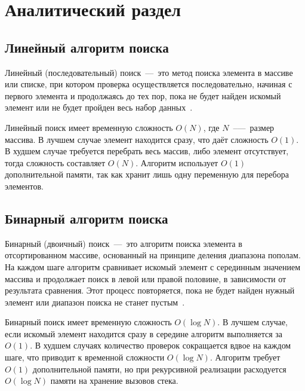 \chapter{Аналитический раздел}
\section{Линейный алгоритм поиска}
Линейный (последовательный) поиск~--–~это метод поиска элемента в массиве или списке, при котором проверка осуществляется последовательно, начиная с первого элемента и продолжаясь до тех пор, пока не будет найден искомый элемент или не будет пройден весь набор данных~\cite{lin_search_alg}.

Линейный поиск имеет временную сложность $O(N)$, где $N$~--—~размер массива. В лучшем случае элемент находится сразу, что даёт сложность $O(1)$. В худшем случае требуется перебрать весь массив, либо элемент отсутствует, тогда сложность составляет $O(N)$. Алгоритм использует $O(1)$ дополнительной памяти, так как хранит лишь одну переменную для перебора элементов.

\section{Бинарный алгоритм поиска}
Бинарный (двоичный) поиск~---~это алгоритм поиска элемента в отсортированном массиве, основанный на принципе деления диапазона пополам. На каждом шаге алгоритм сравнивает искомый элемент с серединным значением массива и продолжает поиск в левой или правой половине, в зависимости от результата сравнения. Этот процесс повторяется, пока не будет найден нужный элемент или диапазон поиска не станет пустым~\cite{bin_search_alg}.  

Бинарный поиск имеет временную сложность $O(\log N)$. В лучшем случае, если искомый элемент находится сразу в середине алгоритм выполняется за $O(1)$. В худшем случаях количество проверок сокращается вдвое на каждом шаге, что приводит к временной сложности $O(\log N)$. Алгоритм требует $O(1)$ дополнительной памяти, но при рекурсивной реализации расходуется $O(\log N)$ памяти на хранение вызовов стека.